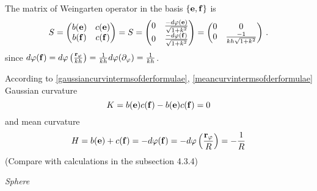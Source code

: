 \documentclass[12pt]{article}
\theoremstyle{theorem}
\numberwithin{equation}{section}
\begin{document}
{  The matrix of Weingarten operator in the basis  $\{{\bf e},{\bf f}\}$ is
             $$
     S=
\begin{pmatrix}
b({\bf e})  &c({\bf e})\cr
b({\bf f})  &c({\bf f})\cr
\end{pmatrix}=
S=
\begin{pmatrix}
0  &{-d\varphi ({\bf e})\over \sqrt {1+k^2}}\cr
0  &{-d\varphi ({\bf f})\over \sqrt {1+k^2}}\cr
\end{pmatrix}=
\begin{pmatrix}
0  &0\cr
0  &{-1\over kh \sqrt {1+k^2}}\cr
\end{pmatrix}\,.
       $$
since $d\varphi({\bf f})=d\varphi\left({{\bf r}_\varphi\over kh}\right)={1\over kh}d\varphi(\partial_\varphi)={1\over kh}$.


According to \eqref{gaussiancurvintermsofderformulae}, \eqref{meancurvintermsofderformulae}
                Gaussian curvature  $$
                K=b({\bf e})c({\bf f})-b({\bf e})c({\bf f})=0
                $$
and
                mean curvature
                 $$
    H=b({\bf e})+c({\bf f})=-d\varphi({\bf f})=-d\varphi\left({{\bf r}_\varphi\over R}\right)=-{1\over R}
                 $$
  (Compare with calculations in the subsection 4.3.4)



\bigskip




{\it Sphere}


\medskip


}
\end{document}
